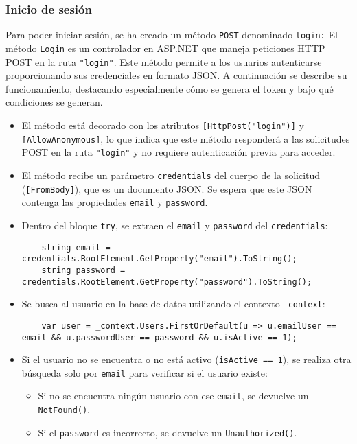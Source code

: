 \subsubsection{Inicio de sesión}
Para poder iniciar sesión, se ha creado un método \texttt{POST} denominado \texttt{login:}
El método \texttt{Login} es un controlador en ASP.NET que maneja peticiones HTTP POST en la ruta \texttt{"login"}. Este método permite a los usuarios autenticarse proporcionando sus credenciales en formato JSON. A continuación se describe su funcionamiento, destacando especialmente cómo se genera el token y bajo qué condiciones se generan.

\begin{itemize}
    \item El método está decorado con los atributos \texttt{[HttpPost("login")]} y \texttt{[AllowAnonymous]}, lo que indica que este método responderá a las solicitudes POST en la ruta \texttt{"login"} y no requiere autenticación previa para acceder.
    \item El método recibe un parámetro \texttt{credentials} del cuerpo de la solicitud (\texttt{[FromBody]}), que es un documento JSON. Se espera que este JSON contenga las propiedades \texttt{email} y \texttt{password}.
    \item Dentro del bloque \texttt{try}, se extraen el \texttt{email} y \texttt{password} del \texttt{credentials}:
    \begin{lstlisting}
    string email = credentials.RootElement.GetProperty("email").ToString();
    string password = credentials.RootElement.GetProperty("password").ToString();
    \end{lstlisting}
    \item Se busca al usuario en la base de datos utilizando el contexto \texttt{\_context}:
    \begin{lstlisting}
    var user = _context.Users.FirstOrDefault(u => u.emailUser == email && u.passwordUser == password && u.isActive == 1);
    \end{lstlisting}
    \item Si el usuario no se encuentra o no está activo (\texttt{isActive == 1}), se realiza otra búsqueda solo por \texttt{email} para verificar si el usuario existe:
    \begin{itemize}
        \item Si no se encuentra ningún usuario con ese \texttt{email}, se devuelve un \texttt{NotFound()}.
        \item Si el \texttt{password} es incorrecto, se devuelve un \texttt{Unauthorized()}.

\end{itemize}
\end{itemize}
